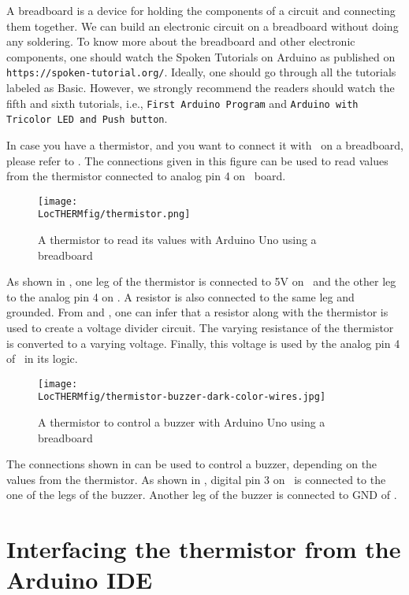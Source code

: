 A breadboard is a device for holding the components of a circuit and connecting
them together. We can build an electronic circuit on a breadboard without doing any
soldering. To know more about the breadboard and other electronic components,
one should watch the Spoken Tutorials on Arduino as published on
  {\tt https://spoken-tutorial.org/}. Ideally, one should go through all the
tutorials labeled as Basic. However, we strongly recommend the readers should
watch the fifth and sixth tutorials, i.e., {\tt First Arduino Program} and
  {\tt Arduino with Tricolor LED and Push button}.

In case you have a thermistor, and you want to connect it with \arduino\ on a breadboard,
please refer to . The connections given in this figure
can be used to read values from the thermistor connected to analog pin 4 on \arduino\
board.
\begin{figure}
  \centering
  \texttt{[image: \\LocTHERMfig/thermistor.png]}
  \caption{A thermistor to read its values with Arduino Uno using a breadboard}
  \label{fig:ard-therm-bread}
\end{figure}
As shown in , one leg of the thermistor is connected
to 5V on \arduino\ and the other leg to the analog pin 4 on \arduino. A resistor is also
connected to the same leg and grounded. From \figref{fig:therm-conn} and , one can infer that a resistor
along with the thermistor is used to create a voltage divider circuit. The varying
resistance of the thermistor is converted to a varying voltage. Finally, this voltage is used
by the analog pin 4 of \arduino\ in its logic.

\begin{figure}
  \centering
  \texttt{[image: \\LocTHERMfig/thermistor-buzzer-dark-color-wires.jpg]}
  \caption{A thermistor to control a buzzer with Arduino Uno using a breadboard}
  \label{fig:ard-therm-buzzer}
\end{figure}
The connections shown in  can be used to control a buzzer,
depending on the values from the thermistor. As shown in \figref{fig:ard-therm-buzzer},
digital pin 3 on \arduino\ is connected to the one of the legs of the buzzer. Another
leg of the buzzer is connected to GND of \arduino.


\section{Interfacing the thermistor from the Arduino IDE}
